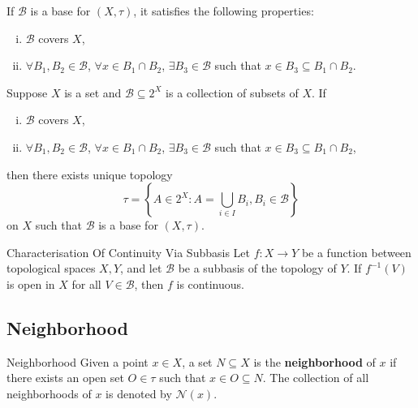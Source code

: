 \documentclass{report}
\begin{document}
\begin{proposition}{}{}
	If $\mathcal{B}$ is a base for $(X,\tau)$, it satisfies the following properties:
	\begin{enumerate}[(i)]
		\item $\mathcal{B}$ covers $X$,
		\item $\forall B_1,B_2\in\mathcal{B}$, $\forall x\in B_1\cap B_2$, $\exists B_3\in \mathcal{B}$ such that $x\in B_3\subseteq B_1\cap B_2$.
	\end{enumerate}
\end{proposition}


\begin{proposition}{}{}
	Suppose $X$ is a set and $\mathcal{B}\subseteq 2^X $ is a collection of subsets of $X$. If
	\begin{enumerate}[(i)]
		\item $\mathcal{B}$ covers $X$,
		\item $\forall B_1,B_2\in\mathcal{B}$, $\forall x\in B_1\cap B_2$, $\exists B_3\in \mathcal{B}$ such that $x\in B_3\subseteq B_1\cap B_2$,
	\end{enumerate}
	then there exists unique topology
	\[
		\tau=\left\{A\in 2^X:A=\bigcup_{i\in I} B_i,B_i\in\mathcal{B}\right\}
	\]
	on $X$ such that $\mathcal{B}$ is a base for $(X,\tau)$.
\end{proposition}


\begin{proposition}{Characterisation Of Continuity Via Subbasis}{}
	Let $f: X \rightarrow Y$ be a function between topological spaces $X, Y$, and let $\mathcal{B}$ be a subbasis of the topology of $Y$. If $f^{-1}(V)$ is open in $X$ for all $V \in \mathcal{B}$, then $f$ is continuous.
\end{proposition}

\subsection{Neighborhood}
\begin{definition}{Neighborhood}{}
	Given a point $x\in X$, a set $N\subseteq X$ is the \textbf{neighborhood} of $x$ if there exists an open set $O\in\tau$ such that $x\in O\subseteq N$. The collection of all neighborhoods of $x$ is denoted by $\mathcal{N}(x)$.
\end{definition}
\end{document}
